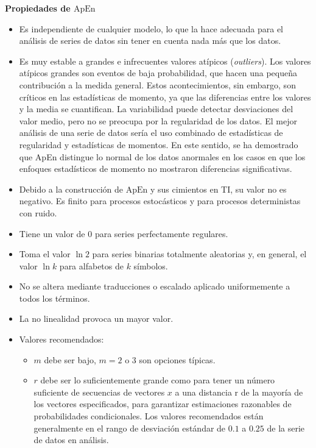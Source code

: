 \documentclass[a4paper,12pt]{article}
\begin{document}
\textbf{Propiedades de $\textrm{ApEn}$}
\begin{itemize}[noitemsep, topsep=2pt]
	\item Es independiente de cualquier modelo, lo que la hace adecuada para el análisis de series de datos sin tener en cuenta nada más que los datos.
	\item Es muy estable a grandes e infrecuentes valores atípicos (\textit{outliers}). Los valores atípicos grandes son eventos de baja probabilidad, que hacen una pequeña contribución a la medida general. Estos acontecimientos, sin embargo, son críticos en las estadísticas de momento, ya que las diferencias entre los valores y la media se cuantifican. La variabilidad puede detectar desviaciones del valor medio, pero no se preocupa por la regularidad de los datos. El mejor análisis de una serie de datos sería el uso combinado de estadísticas de regularidad y estadísticas de momentos. En este sentido, se ha demostrado que ApEn distingue lo normal de los datos anormales en los casos en que los enfoques estadísticos de momento no mostraron diferencias significativas.
	\item Debido a la construcción de $\textrm{ApEn}$ y sus cimientos en TI, su valor no es negativo. Es finito para procesos estocásticos y para procesos deterministas con ruido. 
	\item Tiene un valor de 0 para series perfectamente regulares. 
	\item Toma el valor $\ln 2$ para series binarias totalmente aleatorias y, en general, el valor $\ln k$ para alfabetos de $k$ símbolos. 
	\item No se altera mediante traducciones o escalado aplicado uniformemente a todos los términos.
	\item La no linealidad provoca un mayor valor. 
	\item Valores recomendados: 
	      \begin{itemize}[noitemsep, topsep=2pt]
	      	\item $m$ debe ser bajo, $m = 2$ o $3$ son opciones típicas.
	      	\item $r$ debe ser lo suficientemente grande como para tener un número suficiente de secuencias de vectores $x$ a una distancia r de la mayoría de los vectores especificados, para garantizar estimaciones razonables de probabilidades condicionales. Los valores recomendados están generalmente en el rango de desviación estándar de $0.1$ a $0.25$ de la serie de datos en análisis.
	      \end{itemize}

\end{itemize}
\end{document}
